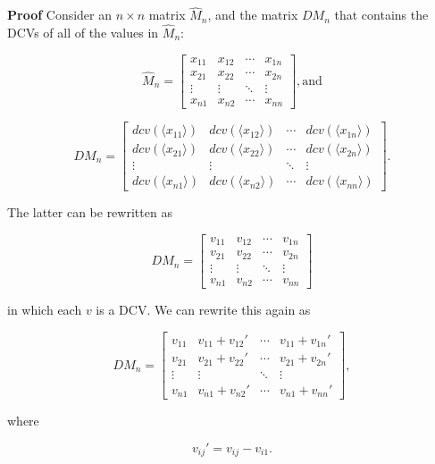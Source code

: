 \documentclass[10pt,letterpaper]{article}
\newenvironment{proof}{\noindent\textbf{Proof} }{\qed \newline}
\newcommand{\qed}{\nobreak \ifvmode \relax \else
      \ifdim\lastskip<1.5em \hskip-\lastskip
      \hskip1.5em plus0em minus0.5em \fi \nobreak
      \vrule height0.75em width0.5em depth0.25em\fi}
\numberwithin{equation}{section}
\begin{document}
\begin{proof}Consider an $n \times n$ matrix $\hat M_n$, and the matrix
  $DM_n$ that contains the DCVs of all of the values in $\hat M_n$:

\[ \hat M_n = \left[ \begin{matrix} 
  x_{11} & x_{12} & \cdots & x_{1n} \\
  x_{21} & x_{22} & \cdots & x_{2n} \\
  \vdots & \vdots & \ddots & \vdots \\
  x_{n1} & x_{n2} & \cdots & x_{nn}
 \end{matrix} \right] , \mbox{and} \]

\[ DM_n = \left[ \begin{matrix} 
  dcv(\langle x_{11} \rangle) & dcv(\langle x_{12} \rangle) & \cdots & dcv(\langle x_{1n} \rangle) \\
  dcv(\langle x_{21} \rangle) & dcv(\langle x_{22} \rangle) & \cdots & dcv(\langle x_{2n} \rangle) \\
  \vdots & \vdots & \ddots & \vdots \\
  dcv(\langle x_{n1} \rangle) & dcv(\langle x_{n2} \rangle) & \cdots & dcv(\langle x_{nn} \rangle)
 \end{matrix} \right] . \]

The latter can be rewritten as

\[ DM_n = \left[ \begin{matrix} 
  v_{11} & v_{12} & \cdots & v_{1n} \\
  v_{21} & v_{22} & \cdots & v_{2n} \\
  \vdots & \vdots & \ddots & \vdots \\
  v_{n1} & v_{n2} & \cdots & v_{nn}
 \end{matrix} \right] \]

in which each $v$ is a DCV.  We can rewrite this again as

\[ DM_n = \left[ \begin{matrix} 
  v_{11} & v_{11} + v_{12} \prime & \cdots & v_{11} + v_{1n} \prime \\
  v_{21} & v_{21} + v_{22} \prime & \cdots & v_{21} + v_{2n} \prime \\
  \vdots & \vdots & \ddots & \vdots \\
  v_{n1} & v_{n1} + v_{n2} \prime & \cdots & v_{n1} + v_{nn} \prime
 \end{matrix} \right] , \]

where

\[ v_{ij} \prime = v_{ij} - v_{i1} . \]


\end{proof}
\end{document}
